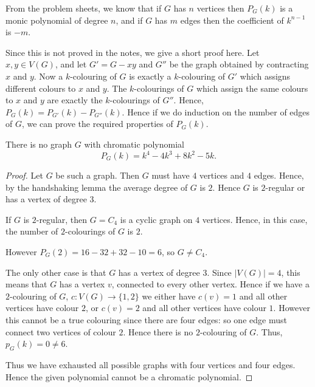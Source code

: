 \documentclass{unswmaths}
\begin{document}
From the problem sheets, we know that if $G$ has $n$ vertices then $P_G(k)$
is a monic polynomial of degree $n$, and if $G$ has $m$ edges 
then the coefficient of $k^{n-1}$ is $-m$.

Since this is not proved in the notes, we give a short proof here. 
Let $x,y \in V(G)$, and let $G' = G-xy$ and $G''$ be the graph
obtained by contracting $x$ and $y$. 
Now a $k$-colouring of $G$ is exactly a $k$-colouring
of $G'$ which assigns different colours to $x$ and $y$. 
The $k$-colourings of $G$ which assign the same colours to $x$ and $y$
are exactly the $k$-colourings of $G''$. Hence, $P_G(k) = P_{G'}(k)-P_{G''}(k)$. 
Hence if we do induction on the number of edges of $G$, we can prove the
required properties of $P_G(k)$.

\begin{lemma}[Part (a)]
    There is no graph $G$ with chromatic polynomial
    \begin{equation*}
        P_G(k) = k^4-4k^3+8k^2-5k.
    \end{equation*}
\end{lemma}
\begin{proof}
    Let $G$ be such a graph. Then $G$ must have $4$
    vertices and $4$ edges. Hence, by the handshaking
    lemma the average degree of $G$ is $2$. Hence $G$ is $2$-regular
    or has a vertex of degree $3$.
    
    If $G$ is $2$-regular, then $G = C_4$ is a cyclic graph on $4$ vertices.
    Hence, in this case, the number of $2$-colourings of $G$ is $2$.
    
    However $P_G(2) = 16-32+32-10 = 6$, so $G \neq C_4$.
    
    The only other case is that $G$ has a vertex of degree $3$. 
    Since $|V(G)| = 4$, this means that $G$ has a vertex $v$, connected to every 
    other vertex. Hence if we have a $2$-colouring of $G$, $c:V(G)\to \{1,2\}$
    we either have $c(v) = 1$ and all other vertices have colour $2$,
    or $c(v) = 2$ and all other vertices have colour $1$.
    However this cannot be a true colouring since there are four edges: so one
    edge must connect two vertices of colour $2$. Hence there is no $2$-colouring
    of $G$. Thus, $p_G(k) = 0 \neq 6$.
    
    Thus we have exhausted all possible graphs with four vertices and four
    edges. Hence the given polynomial cannot be a chromatic polynomial.
\end{proof}
\end{document}
